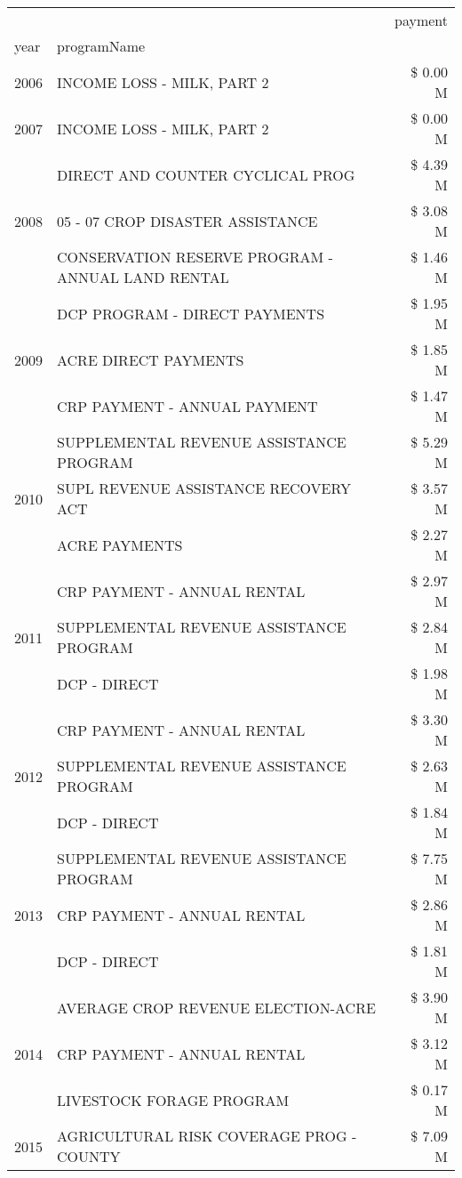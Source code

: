 \begin{tabular}{llr}
\toprule
 &  & payment \\
year & programName &  \\
\midrule
2006 & INCOME LOSS - MILK, PART 2 & \$ 0.00 M \\
\cline{1-3}
2007 & INCOME LOSS - MILK, PART 2 & \$ 0.00 M \\
\cline{1-3}
\multirow[t]{3}{*}{2008} & DIRECT AND COUNTER CYCLICAL PROG & \$ 4.39 M \\
 & 05 - 07 CROP DISASTER ASSISTANCE & \$ 3.08 M \\
 & CONSERVATION RESERVE PROGRAM - ANNUAL LAND RENTAL & \$ 1.46 M \\
\cline{1-3}
\multirow[t]{3}{*}{2009} & DCP PROGRAM - DIRECT PAYMENTS & \$ 1.95 M \\
 & ACRE DIRECT PAYMENTS & \$ 1.85 M \\
 & CRP PAYMENT - ANNUAL PAYMENT & \$ 1.47 M \\
\cline{1-3}
\multirow[t]{3}{*}{2010} & SUPPLEMENTAL REVENUE ASSISTANCE PROGRAM & \$ 5.29 M \\
 & SUPL REVENUE ASSISTANCE RECOVERY ACT & \$ 3.57 M \\
 & ACRE PAYMENTS & \$ 2.27 M \\
\cline{1-3}
\multirow[t]{3}{*}{2011} & CRP PAYMENT - ANNUAL RENTAL & \$ 2.97 M \\
 & SUPPLEMENTAL REVENUE ASSISTANCE PROGRAM & \$ 2.84 M \\
 & DCP - DIRECT & \$ 1.98 M \\
\cline{1-3}
\multirow[t]{3}{*}{2012} & CRP PAYMENT - ANNUAL RENTAL & \$ 3.30 M \\
 & SUPPLEMENTAL REVENUE ASSISTANCE PROGRAM & \$ 2.63 M \\
 & DCP - DIRECT & \$ 1.84 M \\
\cline{1-3}
\multirow[t]{3}{*}{2013} & SUPPLEMENTAL REVENUE ASSISTANCE PROGRAM & \$ 7.75 M \\
 & CRP PAYMENT - ANNUAL RENTAL & \$ 2.86 M \\
 & DCP - DIRECT & \$ 1.81 M \\
\cline{1-3}
\multirow[t]{3}{*}{2014} & AVERAGE CROP REVENUE ELECTION-ACRE & \$ 3.90 M \\
 & CRP PAYMENT - ANNUAL RENTAL & \$ 3.12 M \\
 & LIVESTOCK FORAGE PROGRAM & \$ 0.17 M \\
\cline{1-3}
\multirow[t]{3}{*}{2015} & AGRICULTURAL RISK COVERAGE PROG - COUNTY & \$ 7.09 M \\

\end{tabular}
